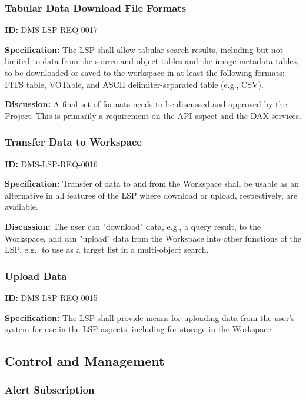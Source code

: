 \documentclass[SE,toc,lsstdraft]{lsstdoc}
\begin{document}
\subsubsection{Tabular Data Download File Formats}

\label{DMS-LSP-REQ-0017}
\textbf{ID:} DMS-LSP-REQ-0017

\textbf{Specification:}
The LSP shall allow tabular search results, including but not limited to data from the source and object tables and the image metadata tables, to be downloaded or saved to the workspace in at least the following formats: FITS table, VOTable, and ASCII delimiter-separated table (e.g., CSV).

\textbf{Discussion:}
A final set of formats needs to be discussed and approved by the Project.
This is primarily a requirement on the API aspect and the DAX services.

\subsubsection{Transfer Data to Workspace}

\label{DMS-LSP-REQ-0016}
\textbf{ID:} DMS-LSP-REQ-0016

\textbf{Specification:}
Transfer of data to and from the Workspace shall be usable as an alternative in all features of the LSP where download or upload, respectively, are available.

\textbf{Discussion:}
The user can "download" data, e.g., a query result, to the Workspace, and can "upload" data from the Workspace into other functions of the LSP, e.g., to use as a target list in a multi-object search.

\subsubsection{Upload Data}

\label{DMS-LSP-REQ-0015}
\textbf{ID:} DMS-LSP-REQ-0015

\textbf{Specification:}
The LSP shall provide means for uploading data from the user's system for use in the LSP aspects, including for storage in the Workspace.

\subsection{Control and Management}

\subsubsection{Alert Subscription}
\end{document}
